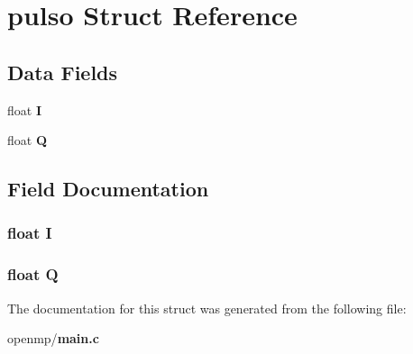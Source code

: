 \section{pulso Struct Reference}
\label{structpulso}
\subsection*{Data Fields}
\begin{DoxyCompactItemize}
\item 
float {\bf I}
\item 
float {\bf Q}
\end{DoxyCompactItemize}


\subsection{Field Documentation}
\subsubsection[{I}]{\setlength{\rightskip}{0pt plus 5cm}float I}\label{structpulso_a145f61de888f096c52a2945234a407b0}
\subsubsection[{Q}]{\setlength{\rightskip}{0pt plus 5cm}float Q}\label{structpulso_a2297f86a6b8c26836b1f21bcf17c7a8b}


The documentation for this struct was generated from the following file\+:\begin{DoxyCompactItemize}
\item 
openmp/{\bf main.\+c}\end{DoxyCompactItemize}
